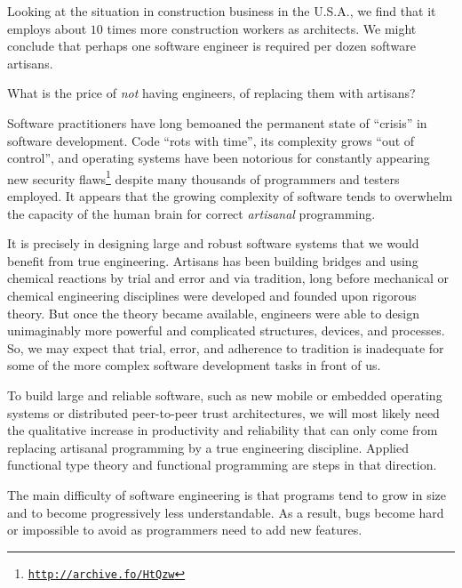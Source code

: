 Looking at the situation in construction business in the U.S.A., we
find that it employs about $10$ times more construction workers as
architects. We might conclude that perhaps one software engineer is
required per dozen software artisans.

What is the price of \emph{not} having engineers, of replacing them
with artisans?

Software practitioners have long bemoaned the permanent state of \textsf{``}crisis\textsf{''}
in software development. Code \textsf{``}rots with time\textsf{''}, its complexity
grows \textsf{``}out of control\textsf{''}, and operating systems have been notorious
for constantly appearing new security flaws\footnote{\texttt{\href{http://archive.fo/HtQzw}{http://archive.fo/HtQzw}}}
despite many thousands of programmers and testers employed. It appears
that the growing complexity of software tends to overwhelm the capacity
of the human brain for correct \emph{artisanal} programming.

It is precisely in designing large and robust software systems that
we would benefit from true engineering. Artisans has been building
bridges and using chemical reactions by trial and error and via tradition,
long before mechanical or chemical engineering disciplines were developed
and founded upon rigorous theory. But once the theory became available,
engineers were able to design unimaginably more powerful and complicated
structures, devices, and processes. So, we may expect that trial,
error, and adherence to tradition is inadequate for some of the more
complex software development tasks in front of us. 

To build large and reliable software, such as new mobile or embedded
operating systems or distributed peer-to-peer trust architectures,
we will most likely need the qualitative increase in productivity
and reliability that can only come from replacing artisanal programming
by a true engineering discipline. Applied functional type theory and
functional programming are steps in that direction.


The main difficulty of software engineering is that programs tend
to grow in size and to become progressively less understandable. As
a result, bugs become hard or impossible to avoid as programmers need
to add new features. 

